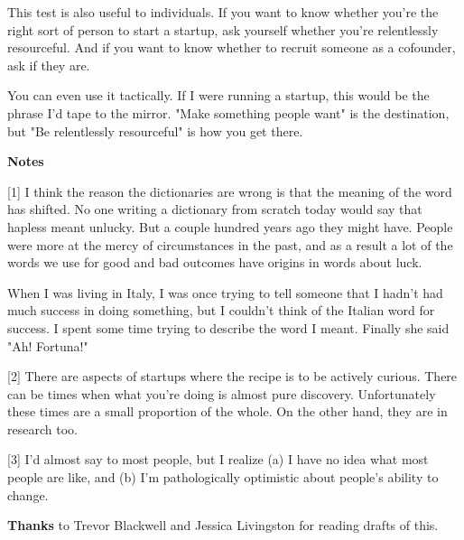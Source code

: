 This test is also useful to
                    individuals. If you want to know whether you're the right
                    sort of person to start a startup, ask yourself whether
                    you're relentlessly resourceful. And if you want to know
                    whether to recruit someone as a cofounder, ask if they
                    are.

You can even use it tactically. If I were
                    running a startup, this would be the phrase I'd tape to the
                    mirror. "Make something people want" is the destination, but
                    "Be relentlessly resourceful" is how you get there.








                    \textbf{Notes}

[1] I think the reason the dictionaries are wrong is that the
                    meaning of the word has shifted. No one writing a dictionary
                    from scratch today would say that hapless meant unlucky. But
                    a couple hundred years ago they might have. People were more
                    at the mercy of circumstances in the past, and as a result a
                    lot of the words we use for good and bad outcomes have
                    origins in words about luck.

When I was living in
                    Italy, I was once trying to tell someone that I hadn't had
                    much success in doing something, but I couldn't think of the
                    Italian word for success. I spent some time trying to
                    describe the word I meant. Finally she said "Ah!
                    Fortuna!"

[2] There are aspects of startups where the recipe is to be
                    actively curious. There can be times when what you're doing
                    is almost pure discovery. Unfortunately these times are a
                    small proportion of the whole. On the other hand, they are
                    in research too.

[3] I'd almost say to most people, but I realize (a) I have
                    no idea what most people are like, and (b) I'm
                    pathologically optimistic about people's ability to
                    change.

\textbf{Thanks} to Trevor Blackwell and
                    Jessica Livingston for reading drafts of this.



              
            
          
            
              
                


                  
              
            
          
